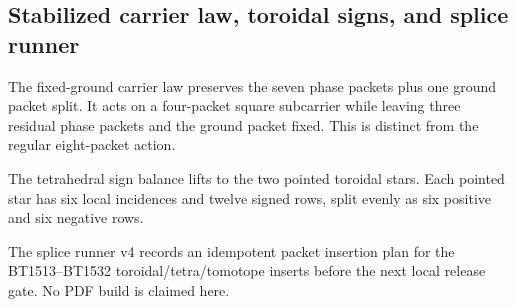 \subsection{Stabilized carrier law, toroidal signs, and splice runner}
\label{sec:bt1533-bt1535-stabilized-sign-splice}

The fixed-ground carrier law preserves the seven phase packets plus one ground packet split.  It acts on a four-packet square subcarrier while leaving three residual phase packets and the ground packet fixed.  This is distinct from the regular eight-packet action.

The tetrahedral sign balance lifts to the two pointed toroidal stars.  Each pointed star has six local incidences and twelve signed rows, split evenly as six positive and six negative rows.

The splice runner v4 records an idempotent packet insertion plan for the BT1513--BT1532 toroidal/tetra/tomotope inserts before the next local release gate.  No PDF build is claimed here.
